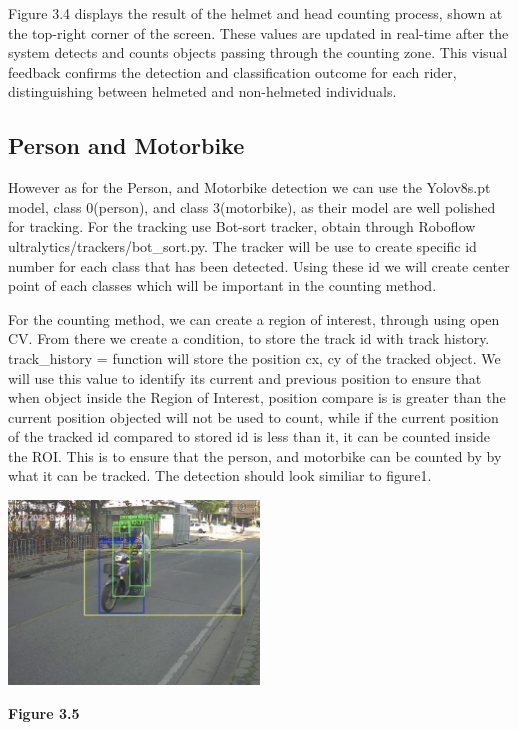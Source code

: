 		\noindent\hspace{2.5em}Figure 3.4 displays the result of the helmet and head counting process, shown at the top-right corner of the screen. These values are updated in real-time after the system detects and counts objects passing through the counting zone. This visual feedback confirms the detection and classification outcome for each rider, distinguishing between helmeted and non-helmeted individuals.
	
	
	
	
\subsection{Person and Motorbike}
\noindent\hspace{2.5em}However as for the Person, and Motorbike detection we can use the Yolov8s.pt model, class 0(person), and class 3(motorbike), as their model are well polished for tracking. For the tracking use Bot-sort tracker, obtain through Roboflow ultralytics/trackers/bot\_sort.py. The tracker will be use to create specific id number for each class that has been detected. Using these id we will create center point of each classes which will be important in the counting method.


\noindent\hspace{2.5em}For the counting method, we can create a region of interest, through using open CV. From there we create a condition, to store the track id with track history. track\_history = {}   function will store the position cx, cy of the tracked object. We will use this value to identify its current and previous position to ensure that when object inside the Region of Interest, position compare is is greater than the current position objected will not be used to count, while if the current position of the tracked id compared to stored id is less than it, it can be counted inside the ROI. This is to ensure that the person, and motorbike can be counted by by what it can be tracked. The detection should look similiar to figure1.

\begin{center}
	\includegraphics[width=0.5\textwidth]{fig1.png}
	
	\vspace{0.5em}
	\textbf{Figure 3.5}
\end{center}


